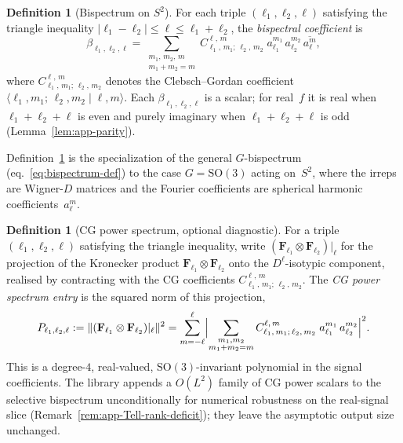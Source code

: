 \documentclass{article}
\theoremstyle{definition}
\newtheorem{definition}[theorem]{Definition}
\theoremstyle{remark}
\newcommand{\SO}{\mathrm{SO}}
\newcommand{\CG}[6]{C^{#5,\,#6}_{#1,\,#2;\,#3,\,#4}}
\newcommand{\abs}[1]{\lvert #1 \rvert}
\newcommand{\conj}[1]{\overline{#1}}
\theoremstyle{definition}
\begin{document}
\begin{definition}[Bispectrum on $S^2$]\label{def:app-bispectrum}
For each triple $(\ell_1, \ell_2, \ell)$ satisfying the triangle
inequality $\abs{\ell_1 - \ell_2} \le \ell \le \ell_1 + \ell_2$,
the \emph{bispectral coefficient} is
\begin{equation}\label{eq:app-bispectrum}
  \beta_{\ell_1,\ell_2,\ell}
  = \sum_{\substack{m_1,\,m_2,\,m \\ m_1+m_2=m}}
    \CG{\ell_1}{m_1}{\ell_2}{m_2}{\ell}{m}\;
    a_{\ell_1}^{m_1}\,a_{\ell_2}^{m_2}\,\conj{a_\ell^m},
\end{equation}
where $\CG{\ell_1}{m_1}{\ell_2}{m_2}{\ell}{m}$ denotes the
Clebsch--Gordan coefficient
$\langle \ell_1, m_1;\, \ell_2, m_2 \mid \ell, m \rangle$.
Each $\beta_{\ell_1,\ell_2,\ell}$ is a scalar; for real~$f$ it is
real when $\ell_1{+}\ell_2{+}\ell$ is even and purely imaginary when
$\ell_1{+}\ell_2{+}\ell$ is odd (Lemma~\ref{lem:app-parity}).
\end{definition}

Definition~\ref{def:app-bispectrum} is the specialization of the
general $G$-bispectrum (eq.~\eqref{eq:bispectrum-def}) to the case
$G = \SO(3)$ acting on~$S^2$, where the irreps are Wigner-$D$
matrices and the Fourier coefficients are spherical harmonic
coefficients~$a_\ell^m$.

\begin{definition}[CG power spectrum, optional diagnostic]\label{def:app-cg-power}
For a triple $(\ell_1, \ell_2, \ell)$ satisfying the triangle
inequality, write
$(\mathbf{F}_{\ell_1} \otimes \mathbf{F}_{\ell_2})\big|_\ell$
for the projection of the Kronecker product
$\mathbf{F}_{\ell_1} \otimes \mathbf{F}_{\ell_2}$ onto the
$D^\ell$-isotypic component, realised by contracting with the CG
coefficients $\CG{\ell_1}{m_1}{\ell_2}{m_2}{\ell}{m}$. The
\emph{CG power spectrum entry} is the squared norm of this projection,
\begin{equation}\label{eq:app-cg-power}
  P_{\ell_1,\ell_2,\ell}
  := \lVert (\mathbf{F}_{\ell_1} \otimes \mathbf{F}_{\ell_2})|_\ell
     \rVert^2
  = \sum_{m=-\ell}^{\ell}
    \Bigl\lvert \sum_{\substack{m_1,m_2 \\ m_1+m_2=m}}
      \CG{\ell_1}{m_1}{\ell_2}{m_2}{\ell}{m}\;
      a_{\ell_1}^{m_1}\, a_{\ell_2}^{m_2} \Bigr\rvert^2.
\end{equation}
This is a degree-$4$, real-valued, $\SO(3)$-invariant polynomial in
the signal coefficients. The library appends a $O(L^2)$ family of CG
power scalars to the selective bispectrum unconditionally for
numerical robustness on the real-signal slice
(Remark~\ref{rem:app-Tell-rank-deficit}); they leave the asymptotic
output size unchanged.
\end{definition}
\end{document}
